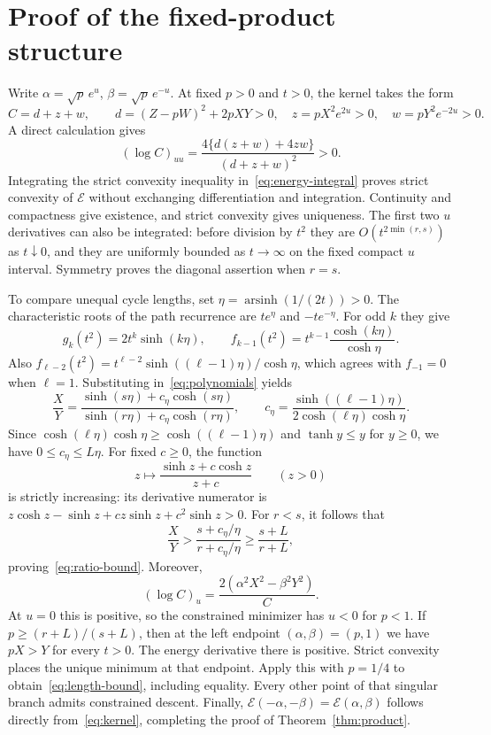 \documentclass[11pt,a4paper]{article}
\theoremstyle{remark}
\DeclareMathOperator{\arsinh}{arsinh}
\newcommand{\E}{\mathcal E}
\begin{document}
\section{Proof of the fixed-product structure}

Write $\alpha=\sqrt p\,e^u$, $\beta=\sqrt p\,e^{-u}$. At fixed
$p>0$ and $t>0$, the kernel takes the form
\[
 C=d+z+w,\qquad
 d=(Z-pW)^2+2pXY>0,\quad
 z=pX^2e^{2u}>0,\quad w=pY^2e^{-2u}>0.
\]
A direct calculation gives
\begin{equation}\label{eq:strict-convex}
 (\log C)_{uu}=\frac{4\{d(z+w)+4zw\}}{(d+z+w)^2}>0.
\end{equation}
Integrating the strict convexity inequality in~\eqref{eq:energy-integral}
proves strict convexity of $\E$ without exchanging differentiation and
integration. Continuity and compactness give existence, and strict
convexity gives uniqueness. The first two $u$ derivatives can also be
integrated: before division by $t^2$ they are
$O(t^{2\min(r,s)})$ as $t\downarrow0$, and they are uniformly bounded
as $t\to\infty$ on the fixed compact $u$ interval. Symmetry proves the
diagonal assertion when $r=s$.

To compare unequal cycle lengths, set $\eta=\arsinh(1/(2t))>0$.
The characteristic roots of the path recurrence are $te^\eta$
and $-te^{-\eta}$. For odd $k$ they give
\[
 g_k(t^2)=2t^k\sinh(k\eta),\qquad
 f_{k-1}(t^2)=t^{k-1}\frac{\cosh(k\eta)}{\cosh\eta}.
\]
Also
$f_{\ell-2}(t^2)=t^{\ell-2}\sinh((\ell-1)\eta)/\cosh\eta$,
which agrees with $f_{-1}=0$ when $\ell=1$.
Substituting in~\eqref{eq:polynomials} yields
\begin{equation}\label{eq:hyperbolic}
 \frac XY=
 \frac{\sinh(s\eta)+c_\eta\cosh(s\eta)}
      {\sinh(r\eta)+c_\eta\cosh(r\eta)},\qquad
 c_\eta=\frac{\sinh((\ell-1)\eta)}
              {2\cosh(\ell\eta)\cosh\eta}.
\end{equation}
Since $\cosh(\ell\eta)\cosh\eta\geq\cosh((\ell-1)\eta)$ and
$\tanh y\leq y$ for $y\geq0$, we have $0\leq c_\eta\leq L\eta$.
For fixed $c\geq0$, the function
\[
 z\longmapsto\frac{\sinh z+c\cosh z}{z+c}\qquad(z>0)
\]
is strictly increasing: its derivative numerator is
$z\cosh z-\sinh z+cz\sinh z+c^2\sinh z>0$.
For $r<s$, it follows that
\[
 \frac XY>\frac{s+c_\eta/\eta}{r+c_\eta/\eta}
            \geq\frac{s+L}{r+L},
\]
proving~\eqref{eq:ratio-bound}. Moreover,
\begin{equation}\label{eq:u-derivative}
 (\log C)_u=\frac{2(\alpha^2X^2-\beta^2Y^2)}{C}.
\end{equation}
At $u=0$ this is positive, so the constrained minimizer has $u<0$
for $p<1$. If $p\geq(r+L)/(s+L)$, then at the left endpoint
$(\alpha,\beta)=(p,1)$ we have $pX>Y$ for every $t>0$.
The energy derivative there is positive. Strict convexity places
the unique minimum at that endpoint. Apply this with $p=1/4$
to obtain~\eqref{eq:length-bound}, including equality.
Every other point of that singular branch admits constrained descent.
Finally, $\E(-\alpha,-\beta)=\E(\alpha,\beta)$ follows directly
from~\eqref{eq:kernel}, completing the proof of Theorem~\ref{thm:product}.
\end{document}
